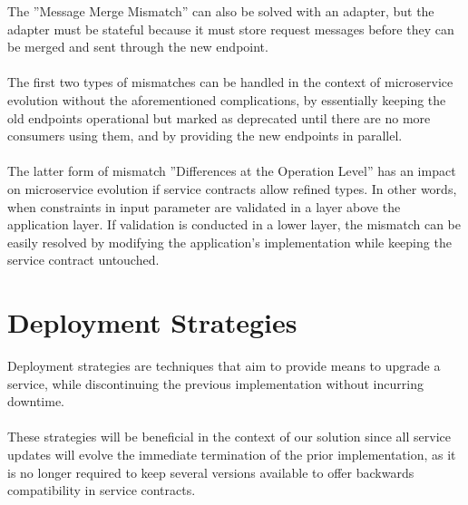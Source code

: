 The ''Message Merge Mismatch'' can also be solved with an adapter, but the adapter must be stateful because it must store request messages before they can be merged and sent through the new endpoint.

\paragraph{}

The first two types of mismatches can be handled in the context of microservice evolution without the aforementioned complications,
by essentially keeping the old endpoints operational but marked as deprecated until  there are no more consumers using them, and by providing the new endpoints in parallel.

\paragraph{}

The latter form of mismatch ''Differences at the Operation Level'' has an impact on microservice evolution if service contracts allow refined types.
In other words, when constraints in input parameter are validated in a layer above the application layer.
If validation is conducted in a lower layer, the mismatch can be easily resolved by modifying the application's implementation while keeping the service contract untouched.

\section{Deployment Strategies} %
\label{sec:deployment_strategies}

Deployment strategies are techniques that aim to provide means to upgrade a service,
while discontinuing the previous implementation without incurring downtime.

\paragraph{}

These strategies will be beneficial in the context of our solution since all service updates will evolve the immediate termination of the prior implementation,
as it is no longer required to keep several versions available to offer backwards compatibility in service contracts.

\paragraph{}


